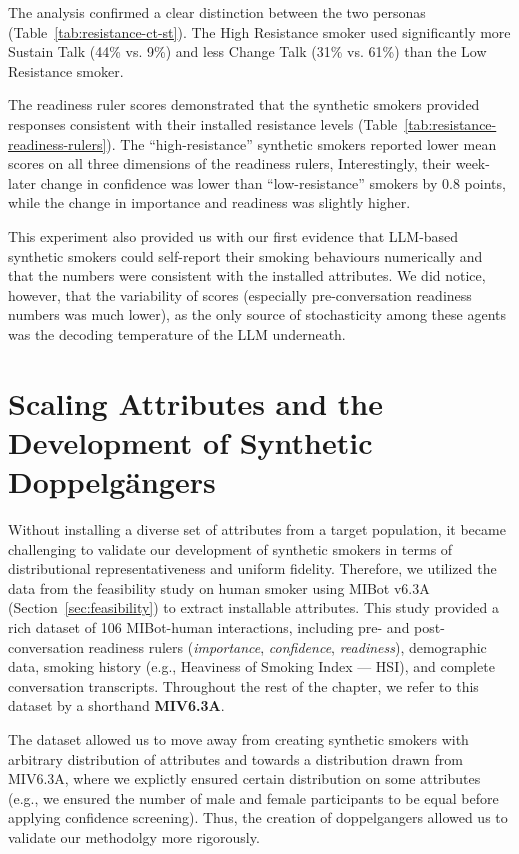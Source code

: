 The analysis confirmed a clear distinction between the two personas (Table~\ref{tab:resistance-ct-st}). The High Resistance smoker used significantly more Sustain Talk (44\% vs. 9\%) and less Change Talk (31\% vs. 61\%) than the Low Resistance smoker.


The readiness ruler scores demonstrated that the synthetic smokers provided responses consistent with their installed resistance levels (Table~\ref{tab:resistance-readiness-rulers}). The ``high-resistance'' synthetic smokers reported lower mean scores on all three dimensions of the readiness rulers, Interestingly, their week-later change in confidence was lower than ``low-resistance'' smokers by 0.8 points, while the change in importance and readiness was slightly higher.



This experiment also provided us with our first evidence that LLM-based synthetic smokers could self-report their smoking behaviours numerically and that the numbers were consistent with the installed attributes. We did notice, however, that the variability of scores (especially pre-conversation readiness numbers was much lower), as the only source of stochasticity among these agents was the decoding temperature of the LLM underneath.

\section{Scaling Attributes and the Development of Synthetic Doppelgängers}
\label{sec:synthetic-smoker-doppelganger}

Without installing a diverse set of attributes from a target population, it became challenging to validate our development of synthetic smokers in terms of distributional representativeness and uniform fidelity. 
Therefore, we utilized the data from the feasibility study on human smoker using MIBot v6.3A (Section~\ref{sec:feasibility}) to extract installable attributes. This study provided a rich dataset of 106 MIBot-human interactions, including pre- and post-conversation readiness rulers (\emph{importance}, \emph{confidence}, \emph{readiness}), demographic data, smoking history (e.g., Heaviness of Smoking Index --- HSI), and complete conversation transcripts. Throughout the rest of the chapter, we refer to this dataset by a shorthand \textbf{MIV6.3A}.

The dataset allowed us to move away from creating synthetic smokers with arbitrary distribution of attributes and towards a distribution drawn from MIV6.3A, where we explictly ensured certain distribution on some attributes (e.g., we ensured the number of male and female participants to be equal before applying confidence screening). Thus, the creation of doppelgangers allowed us to validate our methodolgy more rigorously.

